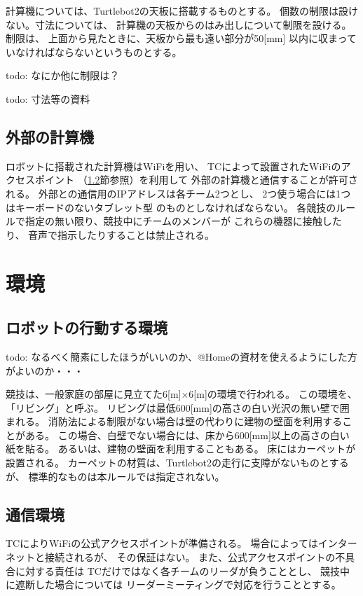 \documentclass[a4j]{jarticle}
\begin{document}
計算機については、Turtlebot2の天板に搭載するものとする。
個数の制限は設けない。寸法については、
計算機の天板からのはみ出しについて制限を設ける。
制限は、
上面から見たときに、天板から最も遠い部分が50[mm]
以内に収まっていなければならないというものとする。

todo: なにか他に制限は？

todo: 寸法等の資料

\subsection{外部の計算機}

ロボットに搭載された計算機はWiFiを用い、
TCによって設置されたWiFiのアクセスポイント
（\ref{sub:network}節参照）を利用して
外部の計算機と通信することが許可される。
外部との通信用のIPアドレスは各チーム2つとし、
2つ使う場合には1つはキーボードのないタブレット型
のものとしなければならない。
各競技のルールで指定の無い限り、競技中にチームのメンバーが
これらの機器に接触したり、
音声で指示したりすることは禁止される。


\section{環境}

\subsection{ロボットの行動する環境}

todo: なるべく簡素にしたほうがいいのか、@Homeの資材を使えるようにした方がよいのか・・・

競技は、一般家庭の部屋に見立てた6[m]$\times$6[m]の環境で行われる。
この環境を、「リビング」と呼ぶ。
リビングは最低600[mm]の高さの白い光沢の無い壁で囲まれる。
消防法による制限がない場合は壁の代わりに建物の壁面を利用することがある。
この場合、白壁でない場合には、床から600[mm]以上の高さの白い紙を貼る。
あるいは、建物の壁面を利用することもある。
床にはカーペットが設置される。
カーペットの材質は、Turtlebot2の走行に支障がないものとするが、
標準的なものは本ルールでは指定されない。

\subsection{通信環境}\label{sub:network}

TCによりWiFiの公式アクセスポイントが準備される。
場合によってはインターネットと接続されるが、
その保証はない。
また、公式アクセスポイントの不具合に対する責任は
TCだけではなく各チームのリーダが負うこととし、
競技中に遮断した場合については
リーダーミーティングで対応を行うこととする。
\end{document}
